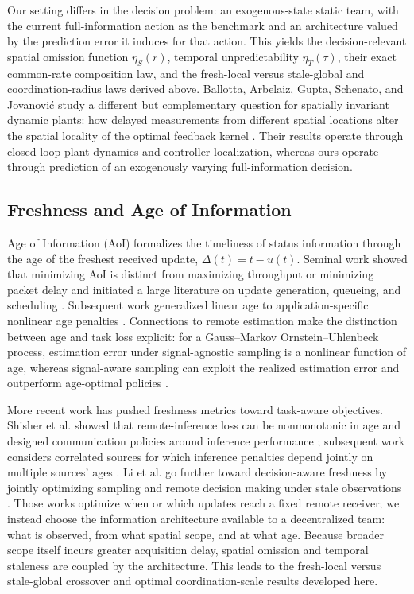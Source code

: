 \documentclass[11pt]{article}
\begin{document}
Our setting differs in the decision problem: an exogenous-state static team,
with the current full-information action as the benchmark and an architecture
valued by the prediction error it induces for that action. This yields the
decision-relevant spatial omission function $\eta_S(r)$, temporal
unpredictability $\eta_T(\tau)$, their exact common-rate composition law, and
the fresh-local versus stale-global and coordination-radius laws derived above.
Ballotta, Arbelaiz, Gupta, Schenato, and Jovanovi\'c study a different but
complementary question for spatially invariant dynamic plants: how delayed
measurements from different spatial locations alter the spatial locality of the
optimal feedback kernel \cite{ballotta2026role}. Their results operate through
closed-loop plant dynamics and controller localization, whereas ours operate
through prediction of an exogenously varying full-information decision.

\subsection{Freshness and Age of Information}
\label{subsec:related_aoi}

Age of Information (AoI) formalizes the timeliness of status information through the age of the freshest received update, $\Delta(t)=t-u(t)$. Seminal work showed that minimizing AoI is distinct from maximizing throughput or minimizing packet delay and initiated a large literature on update generation, queueing, and scheduling \cite{kaul2012realtime,yates2021aoi}. Subsequent work generalized linear age to application-specific nonlinear age penalties \cite{sun2017update}. Connections to remote estimation make the distinction between age and task loss explicit: for a Gauss--Markov Ornstein--Uhlenbeck process, estimation error under signal-agnostic sampling is a nonlinear function of age, whereas signal-aware sampling can exploit the realized estimation error and outperform age-optimal policies \cite{ornee2021ou}.

More recent work has pushed freshness metrics toward task-aware objectives. Shisher et al. showed that remote-inference loss can be nonmonotonic in age and designed communication policies around inference performance \cite{shisher2024timely}; subsequent work considers correlated sources for which inference penalties depend jointly on multiple sources' ages \cite{shisher2026correlated}. Li et al. go further toward decision-aware freshness by jointly optimizing sampling and remote decision making under stale observations \cite{li2026freshness}. Those works optimize when or which updates reach a fixed remote receiver; we instead choose the information architecture available to a decentralized team: what is observed, from what spatial scope, and at what age. Because broader scope itself incurs greater acquisition delay, spatial omission and temporal staleness are coupled by the architecture. This leads to the fresh-local versus stale-global crossover and optimal coordination-scale results developed here.
\end{document}
